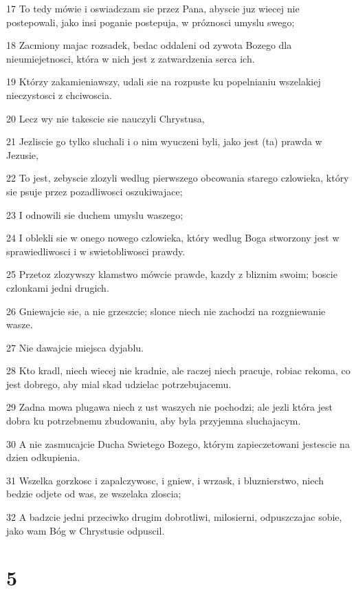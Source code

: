 \par 17 To tedy mówie i oswiadczam sie przez Pana, abyscie juz wiecej nie postepowali, jako insi poganie postepuja, w próznosci umyslu swego;
\par 18 Zacmiony majac rozsadek, bedac oddaleni od zywota Bozego dla nieumiejetnosci, która w nich jest z zatwardzenia serca ich.
\par 19 Którzy zakamieniawszy, udali sie na rozpuste ku popelnianiu wszelakiej nieczystosci z chciwoscia.
\par 20 Lecz wy nie takescie sie nauczyli Chrystusa,
\par 21 Jezliscie go tylko sluchali i o nim wyuczeni byli, jako jest (ta) prawda w Jezusie,
\par 22 To jest, zebyscie zlozyli wedlug pierwszego obcowania starego czlowieka, który sie psuje przez pozadliwosci oszukiwajace;
\par 23 I odnowili sie duchem umyslu waszego;
\par 24 I oblekli sie w onego nowego czlowieka, który wedlug Boga stworzony jest w sprawiedliwosci i w swietobliwosci prawdy.
\par 25 Przetoz zlozywszy klamstwo mówcie prawde, kazdy z bliznim swoim; boscie czlonkami jedni drugich.
\par 26 Gniewajcie sie, a nie grzeszcie; slonce niech nie zachodzi na rozgniewanie wasze.
\par 27 Nie dawajcie miejsca dyjablu.
\par 28 Kto kradl, niech wiecej nie kradnie, ale raczej niech pracuje, robiac rekoma, co jest dobrego, aby mial skad udzielac potrzebujacemu.
\par 29 Zadna mowa plugawa niech z ust waszych nie pochodzi; ale jezli która jest dobra ku potrzebnemu zbudowaniu, aby byla przyjemna sluchajacym.
\par 30 A nie zasmucajcie Ducha Swietego Bozego, którym zapieczetowani jestescie na dzien odkupienia.
\par 31 Wszelka gorzkosc i zapalczywosc, i gniew, i wrzask, i bluznierstwo, niech bedzie odjete od was, ze wszelaka zloscia;
\par 32 A badzcie jedni przeciwko drugim dobrotliwi, milosierni, odpuszczajac sobie, jako wam Bóg w Chrystusie odpuscil.

\chapter{5}

